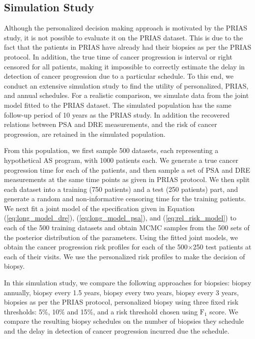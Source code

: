 \subsection{Simulation Study}
Although the personalized decision making approach is motivated by the PRIAS study, it is not possible to evaluate it on the PRIAS dataset. This is due to the fact that the patients in PRIAS have already had their biopsies as per the PRIAS protocol. In addition, the true time of cancer progression is interval or right censored for all patients, making it impossible to correctly estimate the delay in detection of cancer progression due to a particular schedule. To this end, we conduct an extensive simulation study to find the utility of personalized, PRIAS, and annual schedules. For a realistic comparison, we simulate data from the joint model fitted to the PRIAS dataset. The simulated population has the same follow-up period of 10 years as the PRIAS study. In addition the recovered relations between PSA and DRE measurements, and the risk of cancer progression, are retained in the simulated population.

From this population, we first sample 500 datasets, each representing a hypothetical AS program, with 1000 patients each. We generate a true cancer progression time for each of the patients, and then sample a set of PSA and DRE measurements at the same time points as given in PRIAS protocol. We then split each dataset into a training (750 patients) and a test (250 patients) part, and generate a random and non‐informative censoring time for the training patients. We next fit a joint model of the specification given in Equation (\ref{eq:long_model_dre}), (\ref{eq:long_model_psa}), and (\ref{eq:rel_risk_model}) to each of the 500 training datasets and obtain MCMC samples from the 500 sets of the posterior distribution of the parameters. Using the fitted joint models, we obtain the cancer progression risk profiles for each of the 500$\times$250 test patients at each of their visits. We use the personalized risk profiles to make the decision of biopsy. 

In this simulation study, we compare the following approaches for biopsies: biopsy annually, biopsy every 1.5 years, biopsy every two years, biopsy every 3 years, biopsies as per the PRIAS protocol, personalized biopsy using three fixed risk thresholds: 5\%, 10\% and 15\%, and a risk threshold chosen using $\mbox{F}_1$ score. We compare the resulting biopsy schedules on the number of biopsies they schedule and the delay in detection of cancer progression incurred due the schedule.